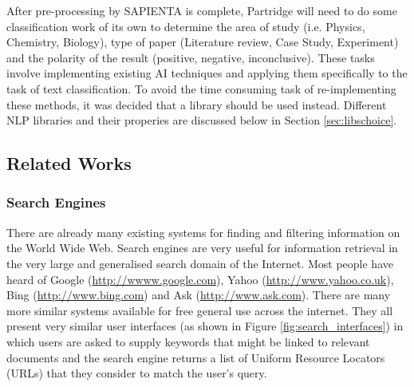 \documentclass[12pt,a4paper]{article}
\begin{document}
After pre-processing by SAPIENTA is complete, Partridge will need to do some
classification work of its own to determine the area of study (i.e. Physics,
Chemistry, Biology), type of paper (Literature review, Case Study, Experiment)
and the polarity of the result (positive, negative, inconclusive). These tasks
involve implementing existing AI techniques and applying them specifically to
the task of text classification. To avoid the time consuming task of
re-implementing these methods, it was decided that a library should be used
instead. Different NLP libraries and their properies are discussed below in
Section \ref{sec:libschoice}.


\subsection{Related Works}
\label{sec:prior_art}

\subsubsection{Search Engines} 

There are already many existing systems for finding and filtering information
on the World Wide Web. Search engines are very useful for information retrieval
in the very large and generalised search domain of the Internet. Most people
have heard of Google (\url{http://wwww.google.com}), Yahoo
(\url{http://www.yahoo.co.uk}), Bing (\url{http://www.bing.com}) and Ask
(\url{http://www.ask.com}). There are many more similar systems available for
free general use across the internet.  They all present very similar user
interfaces (as shown in Figure \ref{fig:search_interfaces}) in which users are
asked to supply keywords that might be linked to relevant documents and the
search engine returns a list of Uniform Resource Locators (URLs) that they
consider to match the user's query.
\end{document}
